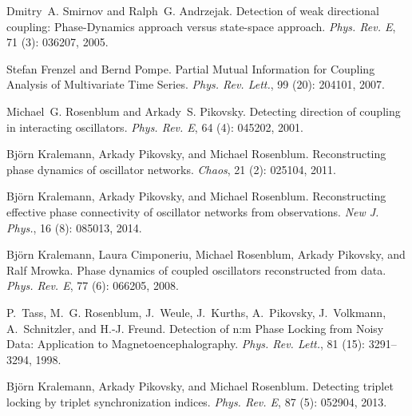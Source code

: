 Dmitry~A. Smirnov and Ralph~G. Andrzejak.
\newblock Detection of weak directional coupling: {{Phase}}-{{Dynamics}}
approach versus state-space approach.
\newblock \emph{Phys. Rev. E}, 71 (3): 036207, 2005.

Stefan Frenzel and Bernd Pompe.
\newblock Partial {{Mutual Information}} for {{Coupling Analysis}} of
{{Multivariate Time Series}}.
\newblock \emph{Phys. Rev. Lett.}, 99 (20): 204101, 2007.

Michael~G. Rosenblum and Arkady~S. Pikovsky.
\newblock Detecting direction of coupling in interacting oscillators.
\newblock \emph{Phys. Rev. E}, 64 (4): 045202, 2001.

Bj{\"o}rn Kralemann, Arkady Pikovsky, and Michael Rosenblum.
\newblock Reconstructing phase dynamics of oscillator networks.
\newblock \emph{Chaos}, 21 (2): 025104, 2011.

Bj{\"o}rn Kralemann, Arkady Pikovsky, and Michael Rosenblum.
\newblock Reconstructing effective phase connectivity of oscillator networks
from observations.
\newblock \emph{New J. Phys.}, 16 (8): 085013, 2014.

Bj{\"o}rn Kralemann, Laura Cimponeriu, Michael Rosenblum, Arkady Pikovsky, and
Ralf Mrowka.
\newblock Phase dynamics of coupled oscillators reconstructed from data.
\newblock \emph{Phys. Rev. E}, 77 (6): 066205, 2008.

P.~Tass, M.~G. Rosenblum, J.~Weule, J.~Kurths, A.~Pikovsky, J.~Volkmann,
A.~Schnitzler, and H.-J. Freund.
\newblock Detection of n:m {{Phase Locking}} from {{Noisy Data}}:
{{Application}} to {{Magnetoencephalography}}.
\newblock \emph{Phys. Rev. Lett.}, 81 (15): 3291--3294, 1998.

Bj{\"o}rn Kralemann, Arkady Pikovsky, and Michael Rosenblum.
\newblock Detecting triplet locking by triplet synchronization indices.
\newblock \emph{Phys. Rev. E}, 87 (5): 052904, 2013.


